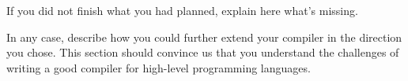 If you did not finish what you had planned, explain here what's missing.

In any case, describe how you could further extend your compiler in the
direction you chose. This section should convince us that you understand the
challenges of writing a good compiler for high-level programming languages.

